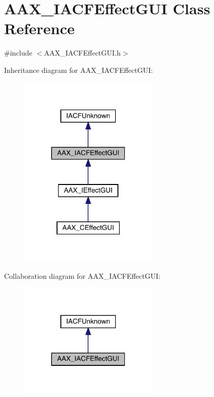 \hypertarget{a01665}{}\section{A\+A\+X\+\_\+\+I\+A\+C\+F\+Effect\+G\+UI Class Reference}
\label{a01665}


{\ttfamily \#include $<$A\+A\+X\+\_\+\+I\+A\+C\+F\+Effect\+G\+U\+I.\+h$>$}



Inheritance diagram for A\+A\+X\+\_\+\+I\+A\+C\+F\+Effect\+G\+UI\+:
\nopagebreak
\begin{figure}[H]
\begin{center}
\leavevmode
\includegraphics[width=188pt]{a01664}
\end{center}
\end{figure}


Collaboration diagram for A\+A\+X\+\_\+\+I\+A\+C\+F\+Effect\+G\+UI\+:
\nopagebreak
\begin{figure}[H]
\begin{center}
\leavevmode
\includegraphics[width=188pt]{a01663}
\end{center}
\end{figure}


